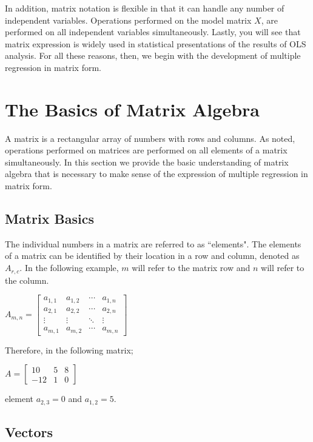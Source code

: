 \documentclass[11pt,openany]{book}\usepackage[]{graphicx}\usepackage[]{color}
\begin{document}
{In addition, matrix notation is flexible in that it can handle any number of independent variables. Operations performed on the model
matrix $X$, are performed on all independent variables simultaneously. Lastly, you will see that matrix expression is widely used in statistical presentations of the results of OLS analysis. For all these reasons, then, we begin with the development of multiple regression in matrix form.

\section{The Basics of Matrix Algebra}

A matrix is a rectangular array of numbers with rows and columns. As noted, operations performed on matrices are performed on all elements of a matrix simultaneously.  In this section we provide the basic understanding of matrix algebra that is necessary to make sense of the expression of multiple regression in matrix form.

\subsection{Matrix Basics}

The individual numbers in a matrix are referred to as ``elements". The elements of a matrix can be  identified by their location in a row and column, denoted as $A_{r,c}$. In the following example, $m$ will refer to the matrix row and $n$ will refer to the column. 

$A_{m,n} =
 \begin{bmatrix}
  a_{1,1} & a_{1,2} & \cdots & a_{1,n} \\
  a_{2,1} & a_{2,2} & \cdots & a_{2,n} \\
  \vdots  & \vdots  & \ddots & \vdots  \\
  a_{m,1} & a_{m,2} & \cdots & a_{m,n}
 \end{bmatrix}$

 \noindent 
 Therefore, in the following matrix;
 
$A = 
\begin{bmatrix}
  10 & 5 & 8 \\
  -12 & 1 & 0
\end{bmatrix}$

\noindent 
element $a_{2,3} = 0$ and $a_{1,2} = 5$.

\subsection{Vectors}

}
\end{document}
